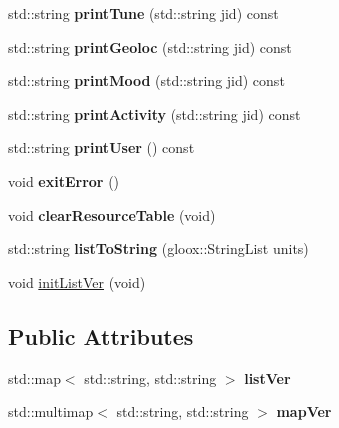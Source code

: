 \begin{DoxyCompactItemize}
\item 
\hypertarget{classDatabase_aacf248f2eefaf9630d5a3330f63a680f}{
std::string {\bfseries printTune} (std::string jid) const }
\label{classDatabase_aacf248f2eefaf9630d5a3330f63a680f}

\item 
\hypertarget{classDatabase_aa7fdaaa4cc61eabaa81178b3689dbd74}{
std::string {\bfseries printGeoloc} (std::string jid) const }
\label{classDatabase_aa7fdaaa4cc61eabaa81178b3689dbd74}

\item 
\hypertarget{classDatabase_aba1e91da98b40211c14a4eea15974548}{
std::string {\bfseries printMood} (std::string jid) const }
\label{classDatabase_aba1e91da98b40211c14a4eea15974548}

\item 
\hypertarget{classDatabase_a13d3f6d42ed491909ca9963bfb4ea68e}{
std::string {\bfseries printActivity} (std::string jid) const }
\label{classDatabase_a13d3f6d42ed491909ca9963bfb4ea68e}

\item 
\hypertarget{classDatabase_a5d733ffa13f136481e3dbdabc9b9ce99}{
std::string {\bfseries printUser} () const }
\label{classDatabase_a5d733ffa13f136481e3dbdabc9b9ce99}

\item 
\hypertarget{classDatabase_ae59c31d44f6b09b22edc7173f0d7f18d}{
void {\bfseries exitError} ()}
\label{classDatabase_ae59c31d44f6b09b22edc7173f0d7f18d}

\item 
\hypertarget{classDatabase_a84791e2489f1aace2bfba61e6e5fdd77}{
void {\bfseries clearResourceTable} (void)}
\label{classDatabase_a84791e2489f1aace2bfba61e6e5fdd77}

\item 
\hypertarget{classDatabase_af8cc000733b73f596f49a0c4a65637ff}{
std::string {\bfseries listToString} (gloox::StringList units)}
\label{classDatabase_af8cc000733b73f596f49a0c4a65637ff}

\item 
void \hyperlink{classDatabase_a94ac4a7584707bfd40643e437e7471a8}{initListVer} (void)
\end{DoxyCompactItemize}
\subsection*{Public Attributes}
\begin{DoxyCompactItemize}
\item 
\hypertarget{classDatabase_a15b316cae6fa42bd196fe02604d6885f}{
std::map$<$ std::string, std::string $>$ {\bfseries listVer}}
\label{classDatabase_a15b316cae6fa42bd196fe02604d6885f}

\item 
\hypertarget{classDatabase_a5d3b8a26bb76c91209970d278cb0faec}{
std::multimap$<$ std::string, std::string $>$ {\bfseries mapVer}}
\label{classDatabase_a5d3b8a26bb76c91209970d278cb0faec}

\end{DoxyCompactItemize}
